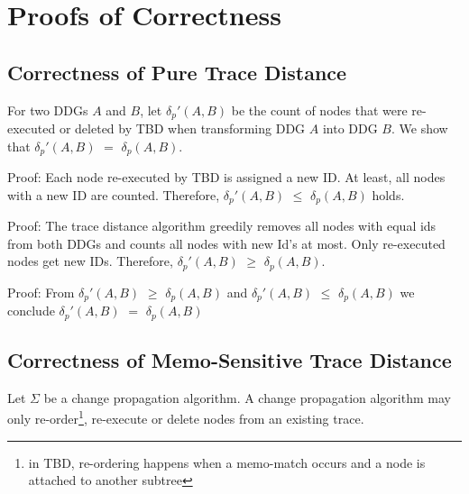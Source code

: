 
\appendix


\section{Proofs of Correctness}
\label{sec:correctness}
\subsection{Correctness of Pure Trace Distance} 

For two DDGs $A$ and $B$, let $\delta_p'(A, B)$ be the count of nodes that were re-executed or deleted by TBD when transforming DDG $A$ into DDG $B$. We show that $\delta_p'(A, B)$ $=$ $\delta_p(A, B)$. 

\begin{lemma}
Proof: Each node re-executed by TBD is assigned a new ID. At least, all nodes with a new ID are counted. Therefore, $\delta_p'(A, B)$ $\le$ $\delta_p(A, B)$ holds.
\end{lemma}

\begin{lemma}
Proof: The trace distance algorithm greedily removes all nodes with equal ids from both DDGs and counts all nodes with new Id's at most. Only re-executed nodes get new IDs. Therefore, $\delta_p'(A, B)$ $\ge$ $\delta_p(A, B)$.
\end{lemma} 

\begin{theorem}[$\delta_p'(A, B)$ $=$ $\delta_p(A, B)$]
Proof: From $\delta_p'(A, B)$ $\ge$ $\delta_p(A, B)$ and $\delta_p'(A, B)$ $\le$ $\delta_p(A, B)$ we conclude $\delta_p'(A, B)$ $=$ $\delta_p(A, B)$ 
\end{theorem}

\subsection{Correctness of Memo-Sensitive Trace Distance} 

\begin{definition}
Let $\Sigma$ be a change propagation algorithm. A change propagation algorithm may only re-order\footnote{in TBD, re-ordering happens when a memo-match occurs and a node is attached to another subtree}, re-execute or delete nodes from an existing trace.
\end{definition}

